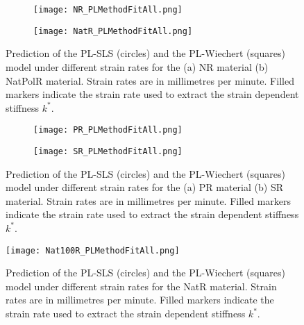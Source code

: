 \begin{figure}[H]
	\vspace*{-2em}
	\centering
	\begin{subfigure}[b]{0.9\textwidth}
		\centering
		\texttt{[image: NR\_PLMethodFitAll.png]}
		\caption{}
		\label{fig:FitAllNR}
	\end{subfigure}
	\begin{subfigure}[b]{0.9\textwidth}
		\centering
		\texttt{[image: NatR\_PLMethodFitAll.png]}
		\caption{}
		\label{fig:FitAllNatR}
	\end{subfigure}
	\caption{Prediction of the PL-SLS (circles) and the PL-Wiechert (squares) model under different strain rates for the (a) NR material (b) NatPolR material. Strain rates are in millimetres per minute. Filled markers indicate the strain rate used to extract the strain dependent stiffness $k^*$. }
	\label{fig:FitAllNR_NatR}
\end{figure}

\begin{figure}[H]
	\vspace*{-2em}
	\centering
	\begin{subfigure}[b]{0.9\textwidth}
		\centering
		\texttt{[image: PR\_PLMethodFitAll.png]}
		\caption{}
		\label{fig:FitAllPR}
	\end{subfigure}
	\begin{subfigure}[b]{0.9\textwidth}
		\centering
		\texttt{[image: SR\_PLMethodFitAll.png]}
		\caption{}
		\label{fig:FitAllSR}
	\end{subfigure}
	\caption{Prediction of the PL-SLS (circles) and the PL-Wiechert (squares) model under different strain rates for the (a) PR material (b) SR material. Strain rates are in millimetres per minute. Filled markers indicate the strain rate used to extract the strain dependent stiffness $k^*$.}
	\label{fig:FitAllPR_SR}
\end{figure}

\begin{figure}[H]
	\centering
	\texttt{[image: Nat100R\_PLMethodFitAll.png]}
	\caption{Prediction of the PL-SLS (circles) and the PL-Wiechert (squares) model under different strain rates for the NatR material. Strain rates are in millimetres per minute. Filled markers indicate the strain rate used to extract the strain dependent stiffness $k^*$.}
	\label{fig:FitAllNat100R}
\end{figure}

